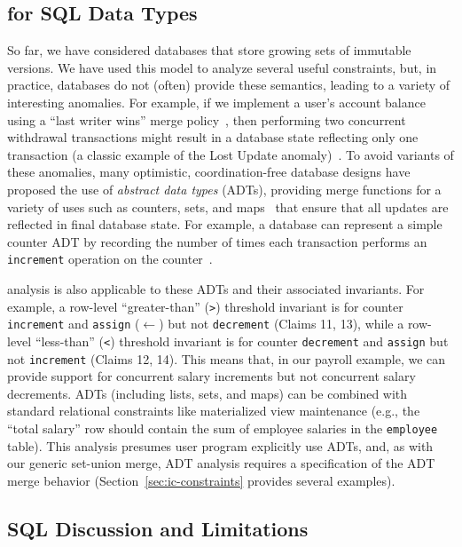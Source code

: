\subsection{\IConfluence for SQL Data Types}

So far, we have considered databases that store growing sets of
immutable versions. We have used this model to analyze several useful
constraints, but, in practice, databases do not (often) provide these
semantics, leading to a variety of interesting anomalies. For example,
if we implement a user's account balance using a ``last writer wins''
merge policy~\cite{crdt}, then performing two concurrent withdrawal
transactions might result in a database state reflecting only one
transaction (a classic example of the Lost Update
anomaly)~\cite{adya,hat-vldb}. To avoid variants of these
anomalies, many optimistic, coordination-free database designs have
proposed the use of \textit{abstract data types} (ADTs), providing
merge functions for a variety of uses such as counters, sets, and
maps~\cite{crdt,atomictransactions,weihl-thesis,blooml} that ensure
that all updates are reflected in final database state. For example, a
database can represent a simple counter ADT by recording the number of
times each transaction performs an \texttt{increment} operation on the
counter~\cite{crdt}.

\Iconfluence analysis is also applicable to these ADTs and their
associated invariants. For example, a row-level ``greater-than''
(\texttt{>}) threshold invariant is \iconfluent for counter
\texttt{increment} and \texttt{assign} ($\gets$) but not
\texttt{decrement} (Claims 11, 13), while a row-level ``less-than''
(\texttt{<}) threshold invariant is \iconfluent for counter
\texttt{decrement} and \texttt{assign} but not \texttt{increment}
(Claims 12, 14). This means that, in our payroll example, we can
provide \cfree support for concurrent salary increments but not
concurrent salary decrements. ADTs (including lists, sets, and maps)
can be combined with standard relational constraints like materialized
view maintenance (e.g., the ``total salary'' row should contain the
sum of employee salaries in the \texttt{employee} table).  This
analysis presumes user program explicitly use ADTs, and, as with our
generic set-union merge, \iconfluence ADT analysis requires a
specification of the ADT merge behavior (Section~\ref{sec:ic-constraints}
provides several examples).

\subsection{SQL Discussion and Limitations}

